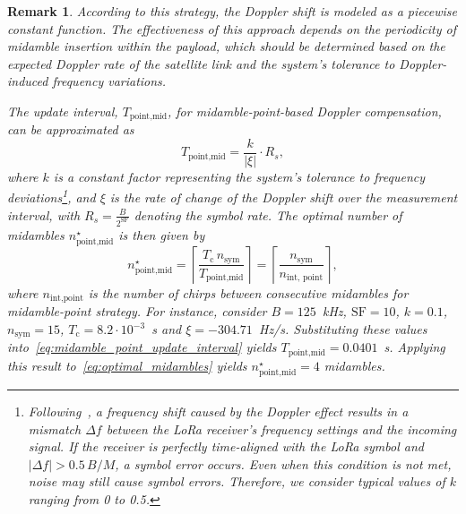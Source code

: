 \documentclass{IEEEtran}
\newtheorem{remark}{Remark}
\begin{document}
\begin{remark}
According to this strategy, the Doppler shift is modeled as a piecewise constant function.
The effectiveness of this approach depends on the periodicity of midamble insertion within the payload, which should be determined based on the expected Doppler rate of the satellite link and the system’s tolerance to Doppler-induced frequency variations.

The update interval, $T_{\text{point,mid}}$, for midamble-point-based Doppler compensation, can be approximated as
\begin{equation}
T_{\text{point,mid}} = \frac{k}{|\xi|} \cdot R_s,
\label{eq:midamble_point_update_interval}
\end{equation}
where $k$ is a constant factor representing the system's tolerance to frequency deviations\footnote{Following~\cite{Ameloot.2021}, a frequency shift caused by the Doppler effect results in a mismatch $\Delta f$ between the \ac{LoRa} receiver's frequency settings and the incoming signal. If the receiver is perfectly time-aligned with the \ac{LoRa} symbol and $|\Delta f| > 0.5\,B/M$, a symbol error occurs. Even when this condition is not met, noise may still cause symbol errors. Therefore, we consider typical values of $k$ ranging from 0 to 0.5.}, and $\xi$ is the rate of change of the Doppler shift over the measurement interval, with $R_s = \frac{B}{2^{\mathrm{SF}}}$ denoting the symbol rate. The optimal number of midambles $n_{\text{point,mid}}^\star$ is then given by
\begin{equation}
n_{\text{point,mid}}^\star = \left\lceil \frac{T_\text{c}\,n_{\text{sym}}}{T_{\text{point,mid}}} \right\rceil = \left\lceil \frac{n_{\text{sym}}}{n_{\text{int, point}}} \right\rceil,
\label{eq:optimal_midambles}
\end{equation}
where $n_\text{int,point}$ is the number of chirps between consecutive midambles for midamble-point strategy. For instance, consider $B=125$~kHz, $\mathrm{SF}=10$, $k=0.1$, $n_{\text{sym}}=15$, ${T_\text{c}=8.2\cdot10^{-3}}$~s and $\xi=-304.71$~Hz/s. Substituting these values into~\eqref{eq:midamble_point_update_interval} yields $T_{\text{point,mid}}=0.0401$~s. Applying this result to~\eqref{eq:optimal_midambles} yields $n_{\text{point,mid}}^\star=4$ midambles.


\end{remark}
\end{document}
